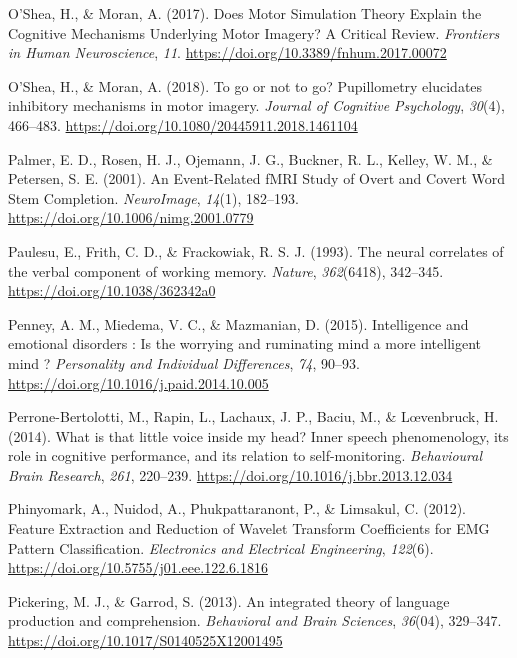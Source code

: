 \documentclass[a4paper,12pt,twoside,openright,oldfontcommands]{memoir}
\begin{document}
\hypertarget{ref-oshea_does_2017}{}
O'Shea, H., \& Moran, A. (2017). Does Motor Simulation Theory Explain
the Cognitive Mechanisms Underlying Motor Imagery? A Critical Review.
\emph{Frontiers in Human Neuroscience}, \emph{11}.
\url{https://doi.org/10.3389/fnhum.2017.00072}

\hypertarget{ref-oshea_go_2018}{}
O'Shea, H., \& Moran, A. (2018). To go or not to go? Pupillometry
elucidates inhibitory mechanisms in motor imagery. \emph{Journal of
Cognitive Psychology}, \emph{30}(4), 466--483.
\url{https://doi.org/10.1080/20445911.2018.1461104}

\hypertarget{ref-palmer_event-related_2001}{}
Palmer, E. D., Rosen, H. J., Ojemann, J. G., Buckner, R. L., Kelley, W.
M., \& Petersen, S. E. (2001). An Event-Related fMRI Study of Overt and
Covert Word Stem Completion. \emph{NeuroImage}, \emph{14}(1), 182--193.
\url{https://doi.org/10.1006/nimg.2001.0779}

\hypertarget{ref-paulesu_neural_1993}{}
Paulesu, E., Frith, C. D., \& Frackowiak, R. S. J. (1993). The neural
correlates of the verbal component of working memory. \emph{Nature},
\emph{362}(6418), 342--345. \url{https://doi.org/10.1038/362342a0}

\hypertarget{ref-Penney2015}{}
Penney, A. M., Miedema, V. C., \& Mazmanian, D. (2015). Intelligence and
emotional disorders : Is the worrying and ruminating mind a more
intelligent mind ? \emph{Personality and Individual Differences},
\emph{74}, 90--93. \url{https://doi.org/10.1016/j.paid.2014.10.005}

\hypertarget{ref-Perrone-Bertolotti2014}{}
Perrone-Bertolotti, M., Rapin, L., Lachaux, J. P., Baciu, M., \&
Lœvenbruck, H. (2014). What is that little voice inside my head? Inner
speech phenomenology, its role in cognitive performance, and its
relation to self-monitoring. \emph{Behavioural Brain Research},
\emph{261}, 220--239. \url{https://doi.org/10.1016/j.bbr.2013.12.034}

\hypertarget{ref-phinyomark_feature_2012}{}
Phinyomark, A., Nuidod, A., Phukpattaranont, P., \& Limsakul, C. (2012).
Feature Extraction and Reduction of Wavelet Transform Coefficients for
EMG Pattern Classification. \emph{Electronics and Electrical
Engineering}, \emph{122}(6).
\url{https://doi.org/10.5755/j01.eee.122.6.1816}

\hypertarget{ref-pickering_integrated_2013}{}
Pickering, M. J., \& Garrod, S. (2013). An integrated theory of language
production and comprehension. \emph{Behavioral and Brain Sciences},
\emph{36}(04), 329--347. \url{https://doi.org/10.1017/S0140525X12001495}
\end{document}
